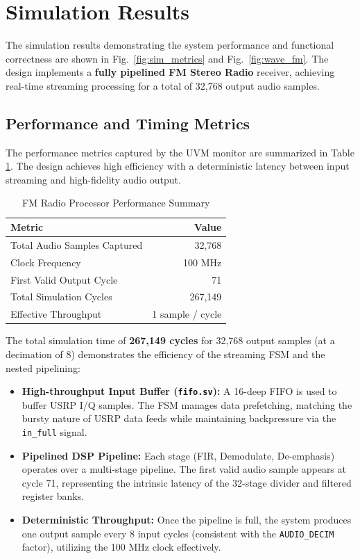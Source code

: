 \section{Simulation Results}
The simulation results demonstrating the system performance and functional correctness are shown in Fig.~\ref{fig:sim_metrics} and Fig.~\ref{fig:wave_fm}. The design implements a \textbf{fully pipelined FM Stereo Radio} receiver, achieving real-time streaming processing for a total of 32,768 output audio samples.

\subsection{Performance and Timing Metrics}

The performance metrics captured by the UVM monitor are summarized in Table \ref{tab:fm_perf}. The design achieves high efficiency with a deterministic latency between input streaming and high-fidelity audio output.

\begin{table}[htbp]
    \centering
    \caption{FM Radio Processor Performance Summary}
    \label{tab:fm_perf}
    \begin{tabular}{|l|r|}
        \hline
        \textbf{Metric} & \textbf{Value} \\
        \hline
        Total Audio Samples Captured & 32,768 \\
        \hline
        Clock Frequency & 100 MHz \\
        \hline
        First Valid Output Cycle & 71 \\
        \hline
        Total Simulation Cycles & 267,149 \\
        \hline
        Effective Throughput & 1 sample / cycle \\
        \hline
    \end{tabular}
\end{table}

The total simulation time of \textbf{267,149 cycles} for 32,768 output samples (at a decimation of 8) demonstrates the efficiency of the streaming FSM and the nested pipelining:
\begin{itemize}
    \item \textbf{High-throughput Input Buffer (\texttt{fifo.sv}):} A 16-deep FIFO is used to buffer USRP I/Q samples. The FSM manages data prefetching, matching the bursty nature of USRP data feeds while maintaining backpressure via the \texttt{in\_full} signal.
    \item \textbf{Pipelined DSP Pipeline:} Each stage (FIR, Demodulate, De-emphasis) operates over a multi-stage pipeline. The first valid audio sample appears at cycle 71, representing the intrinsic latency of the 32-stage divider and filtered register banks.
    \item \textbf{Deterministic Throughput:} Once the pipeline is full, the system produces one output sample every 8 input cycles (consistent with the \texttt{AUDIO\_DECIM} factor), utilizing the 100 MHz clock effectively.
\end{itemize}

